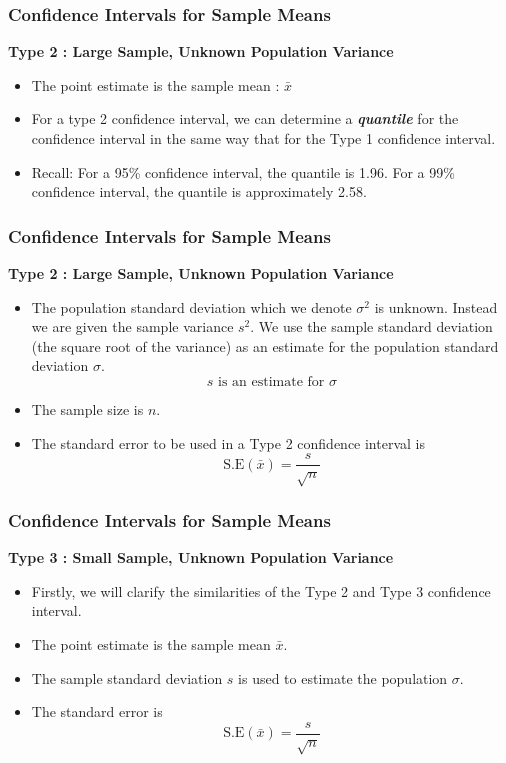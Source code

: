 \documentclass[a4]{beamer}
\begin{document}
\begin{frame}
\frametitle{Confidence Intervals for Sample Means}
\textbf{Type 2 : Large Sample, Unknown Population Variance}\\
\begin{itemize}

\item The point estimate is the sample mean : $\bar{x}$

\item For a type 2 confidence interval, we can determine a \textbf{\textit{quantile}} for the confidence interval in the same way that for the Type 1 confidence interval.

\item Recall: For a 95\% confidence interval, the quantile is 1.96. For a 99\% confidence interval, the quantile is approximately 2.58.

\end{itemize}
\end{frame}

\begin{frame}
\frametitle{Confidence Intervals for Sample Means}
\textbf{Type 2 : Large Sample, Unknown Population Variance}\\
\begin{itemize}
\item The population standard deviation which we denote $\sigma^2$ is unknown.
Instead we are given the sample variance $s^2$. We use the sample standard deviation (the square root of the variance) as an estimate for the population standard deviation $\sigma$.
\[ s \mbox{ is an estimate for } \sigma \]

\item The sample size is $n$.
\item The standard error to be used in a Type 2 confidence interval is
\[ \mbox{S.E}(\bar{x}) = \frac{s}{\sqrt{n}}\]

\end{itemize}
\end{frame}

\begin{frame}
\frametitle{Confidence Intervals for Sample Means}
\textbf{Type 3 : Small Sample, Unknown Population Variance}\\
\begin{itemize}
\item Firstly, we will clarify the similarities of the Type 2 and Type 3 confidence interval.
\item The point estimate is the sample mean $\bar{x}$.
\item The sample standard deviation $s$ is used to estimate the population $\sigma$.
\item The standard error is
\[ \mbox{S.E}(\bar{x}) = \frac{s}{\sqrt{n}}\]
\end{itemize}
\end{frame}
\end{document}
